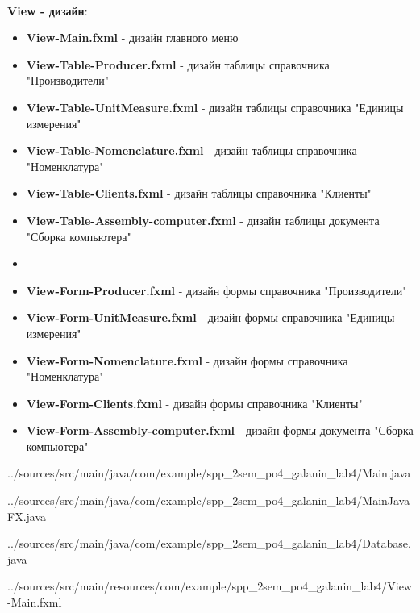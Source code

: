 \documentclass[12pt, a4paper, simple]{eskdtext}
\begin{document}
    \paragraph{} \textbf{View - дизайн}:

    \begin{itemize}
        \item \textbf{View-Main.fxml} - дизайн главного меню
        \item \textbf{View-Table-Producer.fxml} - дизайн таблицы справочника "Производители"
        \item \textbf{View-Table-UnitMeasure.fxml} - дизайн таблицы справочника "Единицы измерения"
        \item \textbf{View-Table-Nomenclature.fxml} - дизайн таблицы справочника "Номенклатура"
        \item \textbf{View-Table-Clients.fxml} - дизайн таблицы справочника "Клиенты"
        \item \textbf{View-Table-Assembly-computer.fxml} - дизайн таблицы документа "Сборка компьютера"
        \item[] \hspace{0pt}
        \item \textbf{View-Form-Producer.fxml} - дизайн формы справочника "Производители"
        \item \textbf{View-Form-UnitMeasure.fxml} - дизайн формы справочника "Единицы измерения"
        \item \textbf{View-Form-Nomenclature.fxml} - дизайн формы справочника "Номенклатура"
        \item \textbf{View-Form-Clients.fxml} - дизайн формы справочника "Клиенты"
        \item \textbf{View-Form-Assembly-computer.fxml} - дизайн формы документа "Сборка компьютера"
    \end{itemize}

    
    {../sources/src/main/java/com/example/spp_2sem_po4_galanin_lab4/Main.java}

    
    {../sources/src/main/java/com/example/spp_2sem_po4_galanin_lab4/MainJavaFX.java}


    
    {../sources/src/main/java/com/example/spp_2sem_po4_galanin_lab4/Database.java}


    
    {../sources/src/main/resources/com/example/spp_2sem_po4_galanin_lab4/View-Main.fxml}
\end{document}
